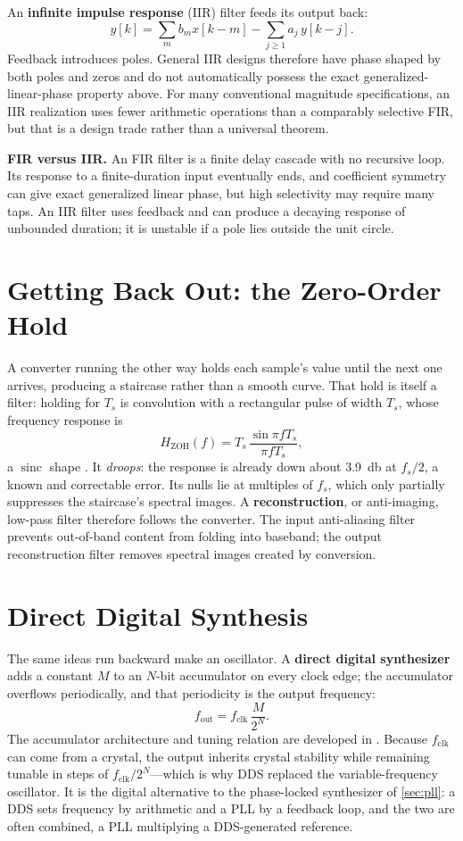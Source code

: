 An \textbf{infinite impulse response} (IIR) filter feeds its output back:
\[
y[k]=\sum_m b_m x[k-m]-\sum_{j\ge1}a_j\,y[k-j].
\]
Feedback introduces poles. General IIR designs therefore have phase shaped by both
poles and zeros and do not automatically possess the exact generalized-linear-phase
property above. For many conventional magnitude specifications, an IIR realization
uses fewer arithmetic operations than a comparably selective FIR, but that is a
design trade rather than a universal theorem.

\begin{controlsbox}
\textbf{FIR versus IIR.} An FIR filter is a finite delay cascade with no recursive
loop. Its response to a finite-duration input eventually ends, and coefficient
symmetry can give exact generalized linear phase, but high selectivity may require
many taps. An IIR filter uses feedback and can produce a decaying response of
unbounded duration; it is unstable if a pole lies outside the unit circle.
\end{controlsbox}

\section{Getting Back Out: the Zero-Order Hold}
A converter running the other way holds each sample's value until the next one arrives,
producing a staircase rather than a smooth curve. That hold is itself a filter: holding
for \(T_s\) is convolution with a rectangular pulse of width \(T_s\), whose frequency
response is
\[
H_{\mathrm{ZOH}}(f)=T_s\,\frac{\sin\pi fT_s}{\pi fT_s},
\]
a \(\operatorname{sinc}\) shape \cite[pp.~186--188]{vankka2005synthesizers}.
It \emph{droops}: the response is already down about \SI{3.9}{\decibel} at
\(f_s/2\), a known and correctable error. Its nulls lie at multiples of \(f_s\),
which only partially suppresses the staircase's spectral images. A
\textbf{reconstruction}, or anti-imaging, low-pass filter therefore follows the
converter. The input anti-aliasing filter prevents out-of-band content from folding
into baseband; the output reconstruction filter removes spectral images created by
conversion.

\section{Direct Digital Synthesis}
The same ideas run backward make an oscillator. A \textbf{direct digital synthesizer}
adds a constant \(M\) to an \(N\)-bit accumulator on every clock edge; the accumulator
overflows periodically, and that periodicity is the output frequency:
\[
f_{\mathrm{out}}=f_{\mathrm{clk}}\,\frac{M}{2^N}.
\]
The accumulator architecture and tuning relation are developed in
\cite[pp.~61--63]{vankka2005synthesizers}.
Because \(f_{\mathrm{clk}}\) can come from a crystal, the output inherits crystal
stability while remaining tunable in steps of \(f_{\mathrm{clk}}/2^N\)---which is why
DDS replaced the variable-frequency oscillator. It is the digital alternative to the
phase-locked synthesizer of \cref{sec:pll}: a DDS sets frequency by arithmetic and a
PLL by a feedback loop, and the two are often combined, a PLL multiplying a
DDS-generated reference.

